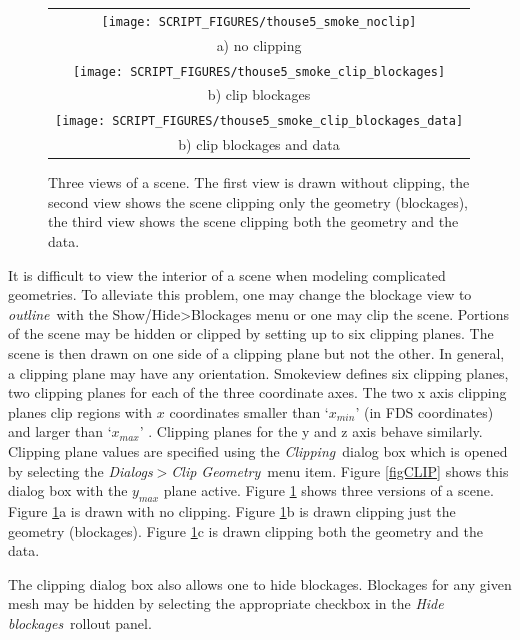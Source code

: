 \documentclass[11pt,twoside]{book}
\begin{document}
\begin{figure}[\figoptions]
\begin{center}
\begin{tabular}{c}
\texttt{[image: SCRIPT\_FIGURES/thouse5\_smoke\_noclip]}\\
a) no clipping\\
\texttt{[image: SCRIPT\_FIGURES/thouse5\_smoke\_clip\_blockages]}\\
b) clip blockages\\
\texttt{[image: SCRIPT\_FIGURES/thouse5\_smoke\_clip\_blockages\_data]}\\
b) clip blockages and data\\
\end{tabular}
\end{center}
\caption[Clipping a scene.]{Three views of a scene. The first view
is drawn without clipping, the second view shows the scene
clipping only the geometry (blockages), the third view shows the
scene clipping both the geometry and the data.} \label{figCLIPPED}
\end{figure}

It is difficult to view the interior of a scene when modeling
complicated geometries.  To alleviate this problem, one may change the blockage view
to {\em outline}\ with the Show/Hide>Blockages menu or one may clip the scene.
Portions of
the scene may be hidden or clipped by setting up to six clipping
planes. The scene is then drawn on one side of a clipping plane but
not the other. In general, a clipping plane may have any
orientation. Smokeview defines six clipping planes, two clipping planes for each of the
three coordinate axes.   The two x axis clipping planes clip
regions with $x$ coordinates smaller than `$x_{min}$' (in FDS coordinates) and larger than `$x_{max}$' .
Clipping planes for the y and z axis behave similarly.
Clipping plane values are
specified using the {\em Clipping}\ dialog box which is opened by
selecting the {\em Dialogs$>$Clip Geometry}\ menu item. Figure
\ref{figCLIP} shows this dialog box with the $y_{max}$ plane
active. Figure \ref{figCLIPPED} shows three versions of a scene.
Figure \ref{figCLIPPED}a is drawn with no clipping. Figure
\ref{figCLIPPED}b is drawn clipping just the geometry (blockages).
Figure \ref{figCLIPPED}c is drawn clipping both the geometry and
the data.

The clipping dialog box also allows one to hide blockages.  Blockages for any given mesh may be hidden
by selecting the appropriate checkbox in the {\em Hide blockages}\ rollout panel.
\end{document}
